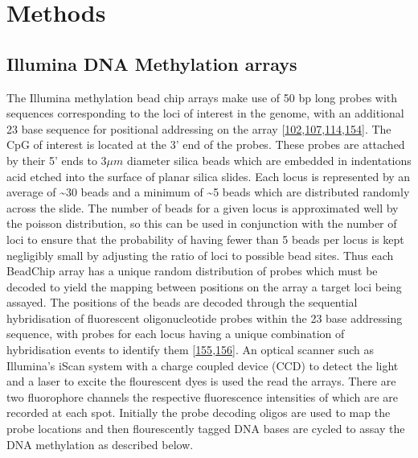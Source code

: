 \documentclass[
]{book}
\begin{document}
\hypertarget{methods}{%
\chapter{Methods}\label{methods}}

\hypertarget{illumina-dna-methylation-arrays}{%
\section{Illumina DNA Methylation arrays}\label{illumina-dna-methylation-arrays}}

The Illumina methylation bead chip arrays make use of 50 bp long probes with sequences corresponding to the loci of interest in the genome, with an additional 23 base sequence for positional addressing on the array {[}\protect\hyperlink{ref-Bibikova2006}{102},\protect\hyperlink{ref-Bibikova2009}{107},\protect\hyperlink{ref-Bibikova2011}{114},\protect\hyperlink{ref-Moran2015}{154}{]}.
The CpG of interest is located at the 3' end of the probes.
These probes are attached by their 5' ends to \(3\mu m\) diameter silica beads which are embedded in indentations acid etched into the surface of planar silica slides.
Each locus is represented by an average of \textasciitilde30 beads and a minimum of \textasciitilde5 beads which are distributed randomly across the slide.
The number of beads for a given locus is approximated well by the poisson distribution, so this can be used in conjunction with the number of loci to ensure that the probability of having fewer than 5 beads per locus is kept negligibly small by adjusting the ratio of loci to possible bead sites.
Thus each BeadChip array has a unique random distribution of probes which must be decoded to yield the mapping between positions on the array a target loci being assayed.
The positions of the beads are decoded through the sequential hybridisation of fluorescent oligonucleotide probes within the 23 base addressing sequence, with probes for each locus having a unique combination of hybridisation events to identify them {[}\protect\hyperlink{ref-Gunderson2004}{155},\protect\hyperlink{ref-Michael1998}{156}{]}.
An optical scanner such as Illumina's iScan system with a charge coupled device (CCD) to detect the light and a laser to excite the flourescent dyes is used the read the arrays.
There are two fluorophore channels the respective fluorescence intensities of which are are recorded at each spot.
Initially the probe decoding oligos are used to map the probe locations and then flourescently tagged DNA bases are cycled to assay the DNA methylation as described below.
\end{document}
